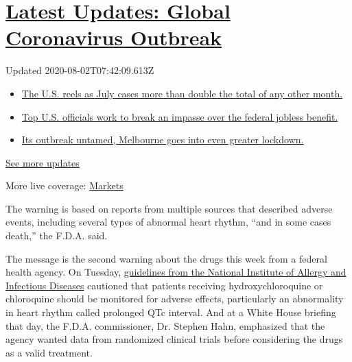 \hypertarget{latest-updates-global-coronavirus-outbreak}{%
\section{\texorpdfstring{\href{https://www.nytimes.com/2020/08/01/world/coronavirus-covid-19.html?action=click\&pgtype=Article\&state=default\&region=MAIN_CONTENT_1\&context=storylines_live_updates}{Latest
Updates: Global Coronavirus
Outbreak}}{Latest Updates: Global Coronavirus Outbreak}}\label{latest-updates-global-coronavirus-outbreak}}

Updated 2020-08-02T07:42:09.613Z

\begin{itemize}
\tightlist
\item
  \href{https://www.nytimes.com/2020/08/01/world/coronavirus-covid-19.html?action=click\&pgtype=Article\&state=default\&region=MAIN_CONTENT_1\&context=storylines_live_updates\#link-34047410}{The
  U.S. reels as July cases more than double the total of any other
  month.}
\item
  \href{https://www.nytimes.com/2020/08/01/world/coronavirus-covid-19.html?action=click\&pgtype=Article\&state=default\&region=MAIN_CONTENT_1\&context=storylines_live_updates\#link-780ec966}{Top
  U.S. officials work to break an impasse over the federal jobless
  benefit.}
\item
  \href{https://www.nytimes.com/2020/08/01/world/coronavirus-covid-19.html?action=click\&pgtype=Article\&state=default\&region=MAIN_CONTENT_1\&context=storylines_live_updates\#link-2bc8948}{Its
  outbreak untamed, Melbourne goes into even greater lockdown.}
\end{itemize}

\href{https://www.nytimes.com/2020/08/01/world/coronavirus-covid-19.html?action=click\&pgtype=Article\&state=default\&region=MAIN_CONTENT_1\&context=storylines_live_updates}{See
more updates}

More live coverage:
\href{https://www.nytimes.com/live/2020/07/31/business/stock-market-today-coronavirus?action=click\&pgtype=Article\&state=default\&region=MAIN_CONTENT_1\&context=storylines_live_updates}{Markets}

The warning is based on reports from multiple sources that described
adverse events, including several types of abnormal heart rhythm, ``and
in some cases death,'' the F.D.A. said.

The message is the second warning about the drugs this week from a
federal health agency. On Tuesday,
\href{https://www.nytimes.com/2020/04/21/health/nih-covid-19-treatment.html?searchResultPosition=1}{guidelines
from the National Institute of Allergy and Infectious Diseases}
cautioned that patients receiving hydroxychloroquine or chloroquine
should be monitored for adverse effects, particularly an abnormality in
heart rhythm called prolonged QTc interval. And at a White House
briefing that day, the F.D.A. commissioner, Dr. Stephen Hahn, emphasized
that the agency wanted data from randomized clinical trials before
considering the drugs as a valid treatment.

